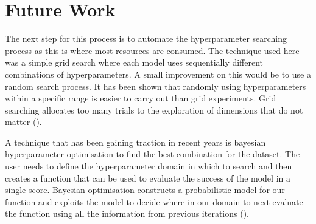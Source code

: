 \section{Future Work}
The next step for this process is to automate the hyperparameter searching process as this is where most resources are consumed. The technique used here was a simple grid search where each model uses sequentially different combinations of hyperparameters. A small improvement on this would be to use a random search process. It has been shown that randomly using hyperparameters within a specific range is easier to carry out than grid experiments. Grid searching allocates too many trials to the exploration of dimensions that do not matter (\cite{bergstra12}). 
\par
A technique that has been gaining traction in recent years is bayesian hyperparameter optimisation to find the best combination for the dataset. The user needs to define the hyperparameter domain in which to search and then creates a function that can be used to evaluate the success of the model in a single score. Bayesian optimisation constructs a probabilistic model for our function and exploits the model to decide where in our domain to next evaluate the function using all the information from previous iterations (\cite{snoek12}).